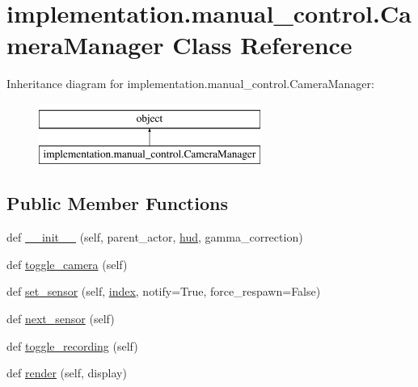 \hypertarget{classimplementation_1_1manual__control_1_1_camera_manager}{}\section{implementation.\+manual\+\_\+control.\+Camera\+Manager Class Reference}
\label{classimplementation_1_1manual__control_1_1_camera_manager}
Inheritance diagram for implementation.\+manual\+\_\+control.\+Camera\+Manager\+:\begin{figure}[H]
\begin{center}
\leavevmode
\includegraphics[height=2.000000cm]{classimplementation_1_1manual__control_1_1_camera_manager}
\end{center}
\end{figure}
\subsection*{Public Member Functions}
\begin{DoxyCompactItemize}
\item 
def \hyperlink{classimplementation_1_1manual__control_1_1_camera_manager_ab610af9a3694f6fc76ef1265a9f9d31d}{\+\_\+\+\_\+init\+\_\+\+\_\+} (self, parent\+\_\+actor, \hyperlink{classimplementation_1_1manual__control_1_1_camera_manager_a71d034dbe54b1daf605bf19dd4fe3520}{hud}, gamma\+\_\+correction)
\item 
def \hyperlink{classimplementation_1_1manual__control_1_1_camera_manager_a75e8e69628d124a50143fe09d9d50fb8}{toggle\+\_\+camera} (self)
\item 
def \hyperlink{classimplementation_1_1manual__control_1_1_camera_manager_a23111e5b5a28fe87fccb6bd853710429}{set\+\_\+sensor} (self, \hyperlink{classimplementation_1_1manual__control_1_1_camera_manager_a12aa1154aeb3e9dee255fcc207aaead7}{index}, notify=True, force\+\_\+respawn=False)
\item 
def \hyperlink{classimplementation_1_1manual__control_1_1_camera_manager_afc8a40102442781286b334ff42d28f99}{next\+\_\+sensor} (self)
\item 
def \hyperlink{classimplementation_1_1manual__control_1_1_camera_manager_aa872c41d5fa86ac5d0621b4582eee539}{toggle\+\_\+recording} (self)
\item 
def \hyperlink{classimplementation_1_1manual__control_1_1_camera_manager_a0ec5eb57da476b77c6ddb344dfa01fd5}{render} (self, display)
\end{DoxyCompactItemize}
